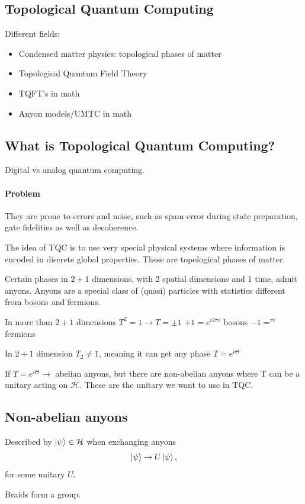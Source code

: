 \documentclass[a4paper,oneside,11pt]{article}
\begin{document}
\subsection{Topological Quantum Computing}
Different fields:
\begin{itemize}
    \item Condensed matter physics: topological phases of matter
    \item Topological Quantum Field Theory
    \item TQFT's in math
    \item Anyon models/UMTC in math
\end{itemize}

\subsection{What is Topological Quantum Computing?}
Digital vs analog quantum computing.

\paragraph{Problem}
They are prone to errors and noise, such as spam error during state preparation, gate fidelities as well as decoherence.

The idea of TQC is to use very special physical systems where information is encoded in discrete global properties.
These are topological phases of matter.

Certain phases in $2+1$ dimensions, with 2 spatial dimensions and 1 time, admit anyons.
Anyons are a special class of (quasi) particles with statistics different from bosons and fermions.

In more than $2+1$ dimensions $T^2=1\rightarrow T=\pm1$
$+1=e^{i2\pi i}$ bosons
$-1=^{\pi i}$ fermions

In $2+1$ dimension $T_2\neq1$, meaning it can get any phase $T=e^{i\Theta}$

If $T=e^{i\Theta}\rightarrow$ abelian anyons, but there are non-abelian anyons where T can be a unitary acting on $\mathcal{H}$.
These are the unitary we want to use in TQC.

\subsection{Non-abelian anyons}
Described by $\ket{\psi}\in\mathcal{H}$ when exchanging anyons
\[\ket{\psi}\to U\ket{\psi},\]
for some unitary $U$.

Braids form a group.
\end{document}

